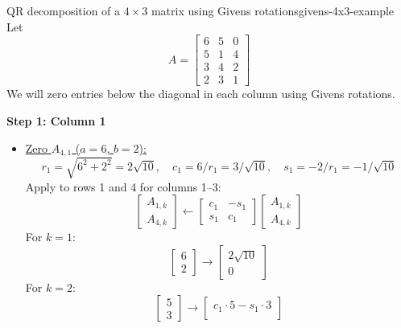 \begin{example}{QR decomposition of a $4\times3$ matrix using Givens rotations}{givens-4x3-example}
    Let
    \[
        A = \begin{bmatrix}
            6 & 5 & 0 \\
            5 & 1 & 4 \\
            3 & 4 & 2 \\
            2 & 3 & 1
        \end{bmatrix}
    \]
    We will zero entries below the diagonal in each column using Givens rotations.

    \textbf{Step 1: Column 1}

    \begin{itemize}
        \item \underline{Zero $A_{4,1}$ ($a=6$, $b=2$):}
        \[
            r_1 = \sqrt{6^2 + 2^2} = 2\sqrt{10}, \quad c_1 = 6/r_1 = 3/\sqrt{10}, \quad s_1 = -2/r_1 = -1/\sqrt{10}
        \]
        Apply to rows 1 and 4 for columns 1--3:
        \[
            \begin{bmatrix}
                A_{1,k} \\
                A_{4,k}
            \end{bmatrix}
            \gets
            \begin{bmatrix}
                c_1 & -s_1 \\
                s_1 & c_1
            \end{bmatrix}
            \begin{bmatrix}
                A_{1,k} \\
                A_{4,k}
            \end{bmatrix}
        \]
        For $k=1$:
        \[
            \begin{bmatrix}
                6 \\
                2
            \end{bmatrix}
            \to
            \begin{bmatrix}
                2\sqrt{10} \\
                0
            \end{bmatrix}
        \]
        For $k=2$:
        \[
            \begin{bmatrix}
                5 \\
                3
            \end{bmatrix}
            \to
            \begin{bmatrix}
                c_1 \cdot 5 - s_1 \cdot 3 \\

\end{bmatrix}\]
\end{itemize}
\end{example}
